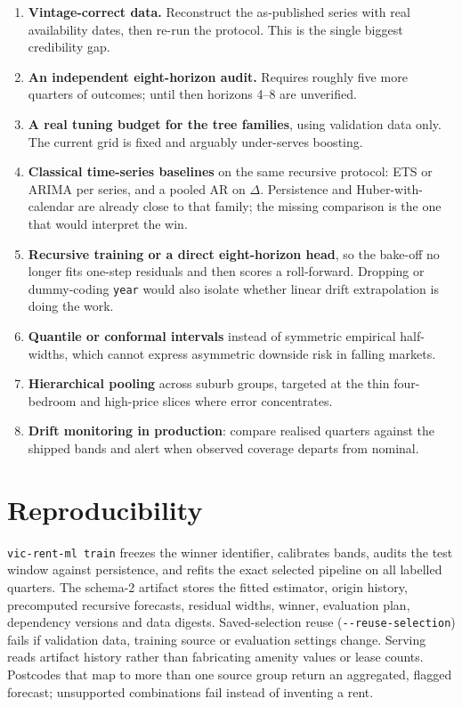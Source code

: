 \documentclass[11pt,a4paper]{article}
\begin{document}
\begin{enumerate}
\item \textbf{Vintage-correct data.} Reconstruct the as-published series with real availability dates, then re-run the protocol. This is the single biggest credibility gap.
\item \textbf{An independent eight-horizon audit.} Requires roughly five more quarters of outcomes; until then horizons 4--8 are unverified.
\item \textbf{A real tuning budget for the tree families}, using validation data only. The current grid is fixed and arguably under-serves boosting.
\item \textbf{Classical time-series baselines} on the same recursive protocol: ETS or ARIMA per series, and a pooled AR on \(\Delta\). Persistence and Huber-with-calendar are already close to that family; the missing comparison is the one that would interpret the win.
\item \textbf{Recursive training or a direct eight-horizon head}, so the bake-off no longer fits one-step residuals and then scores a roll-forward. Dropping or dummy-coding \texttt{year} would also isolate whether linear drift extrapolation is doing the work.
\item \textbf{Quantile or conformal intervals} instead of symmetric empirical half-widths, which cannot express asymmetric downside risk in falling markets.
\item \textbf{Hierarchical pooling} across suburb groups, targeted at the thin four-bedroom and high-price slices where error concentrates.
\item \textbf{Drift monitoring in production}: compare realised quarters against the shipped bands and alert when observed coverage departs from nominal.
\end{enumerate}

\section{Reproducibility}

\texttt{vic{-}rent{-}ml train} freezes the winner identifier, calibrates bands, audits the test window against persistence, and refits the exact selected pipeline on all labelled quarters. The schema-2 artifact stores the fitted estimator, origin history, precomputed recursive forecasts, residual widths, winner, evaluation plan, dependency versions and data digests. Saved-selection reuse (\texttt{{-}{-}reuse{-}selection}) fails if validation data, training source or evaluation settings change. Serving reads artifact history rather than fabricating amenity values or lease counts. Postcodes that map to more than one source group return an aggregated, flagged forecast; unsupported combinations fail instead of inventing a rent.
\end{document}
